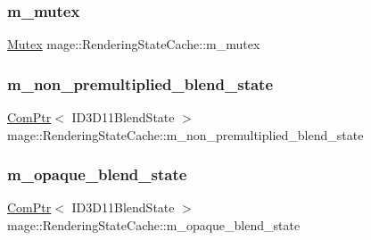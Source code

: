 \hypertarget{structmage_1_1_rendering_state_cache_a97aad58b39eedbeeb27ed47c87ded52a}{}\label{structmage_1_1_rendering_state_cache_a97aad58b39eedbeeb27ed47c87ded52a} 
\subsubsection{\texorpdfstring{m\+\_\+mutex}{m\_mutex}}
{\footnotesize\ttfamily \hyperlink{structmage_1_1_mutex}{Mutex} mage\+::\+Rendering\+State\+Cache\+::m\+\_\+mutex\hspace{0.3cm}{\ttfamily [private]}}

\hypertarget{structmage_1_1_rendering_state_cache_adaf1dd35ebb8e0ad9f2135ad0efee67a}{}\label{structmage_1_1_rendering_state_cache_adaf1dd35ebb8e0ad9f2135ad0efee67a} 
\subsubsection{\texorpdfstring{m\+\_\+non\+\_\+premultiplied\+\_\+blend\+\_\+state}{m\_non\_premultiplied\_blend\_state}}
{\footnotesize\ttfamily \hyperlink{namespacemage_ae74f374780900893caa5555d1031fd79}{Com\+Ptr}$<$ I\+D3\+D11\+Blend\+State $>$ mage\+::\+Rendering\+State\+Cache\+::m\+\_\+non\+\_\+premultiplied\+\_\+blend\+\_\+state\hspace{0.3cm}{\ttfamily [private]}}

\hypertarget{structmage_1_1_rendering_state_cache_ac655dae04386c2998677dff61704c975}{}\label{structmage_1_1_rendering_state_cache_ac655dae04386c2998677dff61704c975} 
\subsubsection{\texorpdfstring{m\+\_\+opaque\+\_\+blend\+\_\+state}{m\_opaque\_blend\_state}}
{\footnotesize\ttfamily \hyperlink{namespacemage_ae74f374780900893caa5555d1031fd79}{Com\+Ptr}$<$ I\+D3\+D11\+Blend\+State $>$ mage\+::\+Rendering\+State\+Cache\+::m\+\_\+opaque\+\_\+blend\+\_\+state\hspace{0.3cm}{\ttfamily [private]}}

